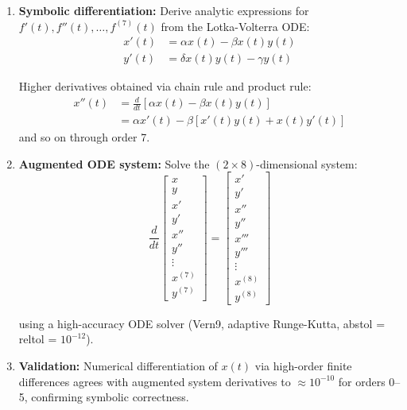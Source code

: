 \begin{enumerate}
    \item \textbf{Symbolic differentiation:} Derive analytic expressions for $f'(t), f''(t), \ldots, f^{(7)}(t)$ from the Lotka-Volterra ODE:
    \begin{align}
    x'(t) &= \alpha x(t) - \beta x(t) y(t) \label{eq:lv_x} \\
    y'(t) &= \delta x(t) y(t) - \gamma y(t) \label{eq:lv_y}
    \end{align}
    
    Higher derivatives obtained via chain rule and product rule:
    \begin{align}
    x''(t) &= \frac{d}{dt}\left[\alpha x(t) - \beta x(t) y(t)\right] \nonumber \\
           &= \alpha x'(t) - \beta \left[x'(t) y(t) + x(t) y'(t)\right] \label{eq:lv_x2}
    \end{align}
    and so on through order 7.
    
    \item \textbf{Augmented ODE system:} Solve the $(2 \times 8)$-dimensional system:
    \begin{equation}
    \frac{d}{dt} \begin{bmatrix} x \\ y \\ x' \\ y' \\ x'' \\ y'' \\ \vdots \\ x^{(7)} \\ y^{(7)} \end{bmatrix}
    = \begin{bmatrix} x' \\ y' \\ x'' \\ y'' \\ x''' \\ y''' \\ \vdots \\ x^{(8)} \\ y^{(8)} \end{bmatrix}
    \end{equation}
    
    using a high-accuracy ODE solver (Vern9, adaptive Runge-Kutta, abstol = reltol = $10^{-12}$).
    
    \item \textbf{Validation:} Numerical differentiation of $x(t)$ via high-order finite differences agrees with augmented system derivatives to $\approx 10^{-10}$ for orders 0--5, confirming symbolic correctness.
\end{enumerate}

